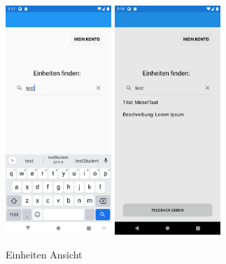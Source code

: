 \begin{figure}[h]
    \begin{center}
    \includegraphics[width=4cm]{pics/Xamarin Student/8 Einheit finden.png}\hfill
    \includegraphics[width=4cm]{pics/Xamarin Student/9 Einheit gefunden.png}
    \caption[HomePage Einheiten Ansicht]{Einheiten Ansicht}
    \end{center}
\end{figure}
\newpage

